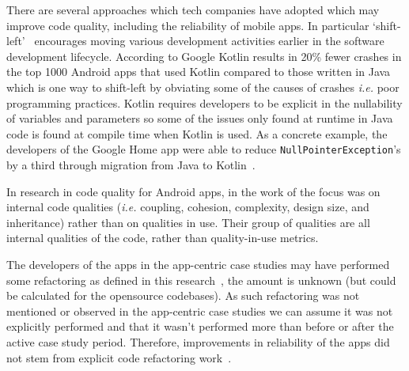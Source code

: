 There are several approaches which tech companies have adopted which may improve code quality, including the reliability of mobile apps. In particular `shift-left'~ encourages moving various development activities earlier in the software development lifecycle. According to Google Kotlin results in 20\% fewer crashes in the top 1000 Android apps that used Kotlin compared to those written in Java~ which is one way to shift-left by obviating some of the causes of crashes \emph{i.e.} poor programming practices. Kotlin requires developers to be explicit in the nullability of variables and parameters so some of the issues only found at runtime in Java code is found at compile time when Kotlin is used. As a concrete example, the developers of the Google Home app were able to reduce \texttt{NullPointerException}'s by a third through migration from Java to Kotlin~.


In research in code quality for Android apps, in the work of  the focus was on internal code qualities (\emph{i.e.} coupling, cohesion, complexity, design size, and inheritance) rather than on qualities in use. Their group of qualities are all internal qualities of the code, rather than quality-in-use metrics. 

The developers of the apps in the app-centric case studies may have performed some refactoring as defined in this research~, the amount is unknown (but could be calculated for the opensource codebases). As such refactoring was not mentioned or observed in the app-centric case studies we can assume it was not explicitly performed and that it wasn't performed more than before or after the active case study period. Therefore, improvements in reliability of the apps did not stem from explicit code refactoring work~.

